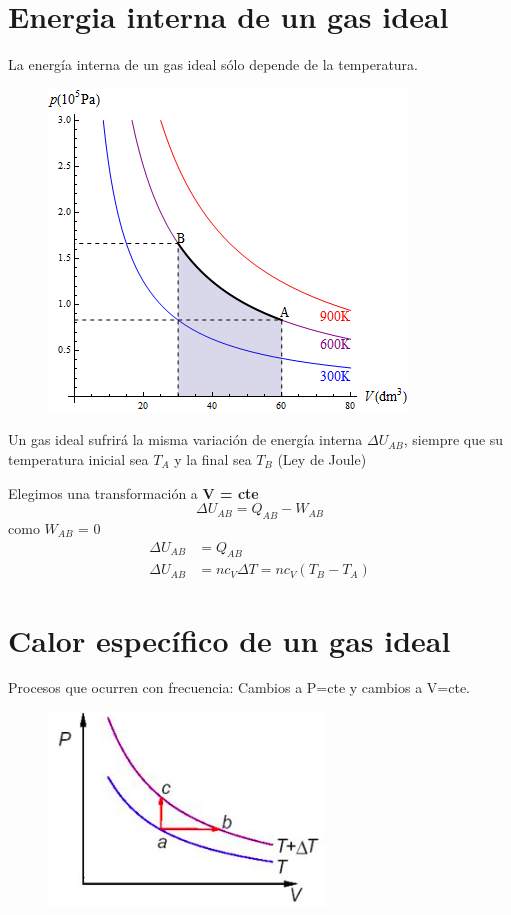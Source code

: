 \documentclass[12pt,twocolumn,a4paper]{report}
\begin{document}
\section*{Energia interna de un gas ideal}
La energía interna de un gas ideal sólo depende de la temperatura. 

\begin{figure}[H]
\centering
\includegraphics[scale=0.5]{graficos/int.png}
\end{figure}
Un gas ideal sufrirá la misma variación de energía interna $\Delta U_{AB}$, siempre que su temperatura inicial sea $T_A$ y la final sea $T_B$ (Ley de Joule) 

Elegimos una transformación a \textbf{V = cte}
\begin{equation*}
\Delta U_{AB} = Q_{AB} - W_{AB}
\end{equation*}
como $W_{AB}$ = 0
\begin{align*}
\Delta U_{AB} &= Q_{AB} \\
\Delta U_{AB} &= nc_V \Delta T = nc_V(T_B - T_A) 
\end{align*}


\section*{Calor específico de un gas ideal}
Procesos que ocurren con frecuencia: Cambios a P=cte y cambios a V=cte. 
\begin{figure}[H]
\centering
\includegraphics[scale=0.5]{graficos/p1.png}
\end{figure}
\end{document}
